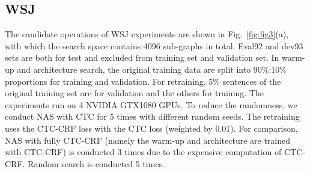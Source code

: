 \documentclass{article}
\newcommand{\figref}{Fig.~\ref}
\begin{document}
\subsection{WSJ}
\label{sec:exp:wsj}
\vspace{-1mm}
The candidate operations of WSJ experiments are shown in \figref{fig:fig3}(a), with which the search space contains 4096 sub-graphs in total.
Eval92 and dev93 sets are both for test and excluded from training set and validation set.
In warm-up and architecture search, the original training data are split into 90\%:10\% proportions for training and validation. For retraining, 5\% sentences of the original training set are for validation and the others for training.
The experiments run on 4 NVIDIA GTX1080 GPUs. To reduce the randomness, we conduct NAS with CTC for 5 times with different random seeds. The retraining uses the CTC-CRF loss with the CTC loss (weighted by 0.01). For comparison, NAS with fully CTC-CRF (namely the warm-up and architecture are trained with CTC-CRF) is conducted 3 times due to the expensive computation of CTC-CRF. Random search is conducted 5 times.
\end{document}
